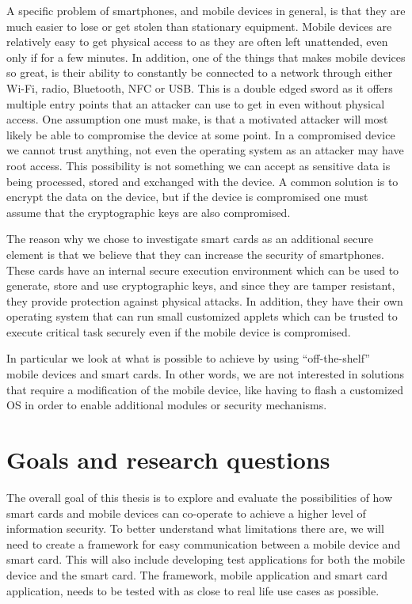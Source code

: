 A specific problem of smartphones, and mobile devices in general, is that they are much easier to lose or get stolen than stationary equipment. Mobile devices are relatively easy to get physical access to as they are often left unattended, even only if for a few minutes. In addition, one of the things that makes mobile devices so great, is their ability to constantly be connected to a network through either Wi-Fi, radio, Bluetooth, NFC or USB. This is a double edged sword as it offers multiple entry points that an attacker can use to get in even without physical access. One assumption one must make, is that a motivated attacker will most likely be able to compromise the device at some point. In a compromised device we cannot trust anything, not even the operating system as an attacker may have root access. This possibility is not something we can accept as sensitive data is being processed, stored and exchanged with the device. A common solution is to encrypt the data on the device, but if the device is compromised one must assume that the cryptographic keys are also compromised.

The reason why we chose to investigate smart cards as an additional secure element is that we believe that they can increase the security of smartphones. These cards have an internal secure execution environment which can be used to generate, store and use cryptographic keys, and since they are tamper resistant, they provide protection against physical attacks. In addition, they have their own operating system that can run small customized applets which can be trusted to execute critical task securely even if the mobile device is compromised.

In particular we look at what is possible to achieve by using ``off-the-shelf'' mobile devices and smart cards. In other words, we are not interested in solutions that require a modification of the mobile device, like having to flash a customized OS in order to enable additional modules or security mechanisms.


\section{Goals and research questions}
\label{sec:goals}
The overall goal of this thesis is to explore and evaluate the possibilities of how smart cards and mobile devices can co-operate to achieve a higher level of information security. To better understand what limitations there are, we will need to create a framework for easy communication between a mobile device and smart card. This will also include developing test applications for both the mobile device and the smart card. The framework, mobile application and smart card application, needs to be tested with as close to real life use cases as possible.


